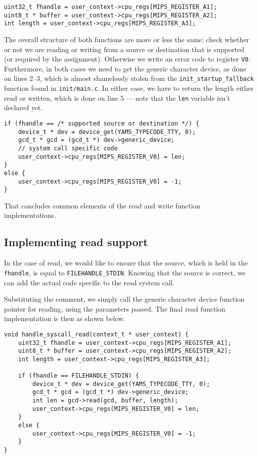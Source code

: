\documentclass[11pt]{article}
\newcommand{\code}[1]{{\tt #1}}
\newcommand{\file}[1]{{\tt #1}}
\begin{document}
\begin{lstlisting}
uint32_t fhandle = user_context->cpu_regs[MIPS_REGISTER_A1];
uint8_t * buffer = user_context->cpu_regs[MIPS_REGISTER_A2];
int length = user_context->cpu_regs[MIPS_REGISTER_A3];
\end{lstlisting}

The overall structure of both functions are more or less the same; check
whether or not we are reading or writing from a source or destination that is
supported (or required by the assignment). Otherwise we write an error code to
register \code{V0}. Furthermore, in both cases we need to get the generic
character device, as done on lines 2--3, which is almost shamelessly stolen
from the \code{init\_startup\_fallback} function found in \file{init/main.c}.
In either case, we have to return the length either read or written, which is
done on line 5 --- note that the \code{len} variable isn't declared yet.

\begin{lstlisting}
if (fhandle == /* supported source or destination */) {
    device_t * dev = device_get(YAMS_TYPECODE_TTY, 0);
    gcd_t * gcd = (gcd_t *) dev->generic_device;
    // system call specific code
    user_context->cpu_regs[MIPS_REGISTER_V0] = len;
}
else {
    user_context->cpu_regs[MIPS_REGISTER_V0] = -1;
}
\end{lstlisting}

That concludes common elements of the read and write function implementations.

\subsection{Implementing read support}
In the case of read, we would like to ensure that the source, which is held
in the \code{fhandle}, is equal to \code{FILEHANDLE\_STDIN}. Knowing that the
source is correct, we can add the actual code specific to the read system
call.

Substituting the comment, we simply call the generic character device function
pointer for reading, using the parameters passed. The final read function
implementation is then as shown below.

\begin{lstlisting}
void handle_syscall_read(context_t * user_context) {
    uint32_t fhandle = user_context->cpu_regs[MIPS_REGISTER_A1];
    uint8_t * buffer = user_context->cpu_regs[MIPS_REGISTER_A2];
    int length = user_context->cpu_regs[MIPS_REGISTER_A3];

    if (fhandle == FILEHANDLE_STDIN) {
        device_t * dev = device_get(YAMS_TYPECODE_TTY, 0);
        gcd_t * gcd = (gcd_t *) dev->generic_device;
        int len = gcd->read(gcd, buffer, length);
        user_context->cpu_regs[MIPS_REGISTER_V0] = len;
    }
    else {
        user_context->cpu_regs[MIPS_REGISTER_V0] = -1;
    }
}
\end{lstlisting}
\end{document}
